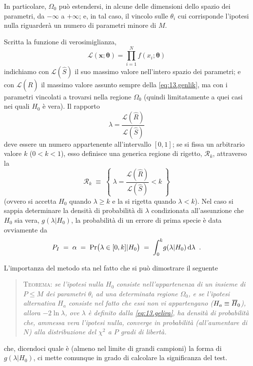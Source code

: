 In particolare, $\Omega_0$ pu\`o estendersi, in alcune delle
dimensioni dello spazio dei parametri, da $-\infty$ a
$+\infty$; e, in tal caso, il vincolo sulle $\theta_i$ cui
corrisponde l'ipotesi nulla riguarder\`a un numero di
parametri minore di $M$.

Scritta la funzione di verosimiglianza,
\begin{equation} \label{eq:13.genlik}
  \mathcal{L} ( \boldsymbol{x}; \boldsymbol{\theta} ) =
    \prod_{i=1}^N f(x_i; \boldsymbol{\theta} )
\end{equation}
indichiamo con $\mathcal{L} (\widehat S)$ il suo massimo
valore nell'intero spazio dei parametri; e con $\mathcal{L}
(\widehat R)$ il massimo valore assunto sempre della
\eqref{eq:13.genlik}, ma con i parametri vincolati a
trovarsi nella regione $\Omega_0$ (quindi limitatamente a
quei casi nei quali $H_0$ \`e vera).  Il rapporto
\begin{equation} \label{eq:13.gelira}
  \lambda = \frac{\mathcal{L} (\widehat R)}{\mathcal{L} (\widehat
    S)}
\end{equation}
deve essere un numero appartenente all'intervallo $[0,1]$;
se si fissa un arbitrario valore $k$ ($0<k<1$), esso
definisce una generica regione di rigetto, $\mathcal{R}_k$,
attraverso la
\begin{equation*}
  \mathcal{R}_k \; \equiv \; \left\{ \; \lambda =
    \frac{\mathcal{L} (\widehat R)}{\mathcal{L} (\widehat
      S)} < k \; \right\}
\end{equation*}
(ovvero si accetta $H_0$ quando $\lambda \ge k$ e la si
rigetta quando $\lambda < k$).  Nel caso si sappia
determinare la densit\`a di probabilit\`a di $\lambda$
condizionata all'assunzione che $H_0$ sia vera, $g(\lambda |
H_0)$, la probabilit\`a di un errore di prima specie \`e
data ovviamente da
\begin{equation*}
  P_I \; = \; \alpha \; = \; \Pr \bigl( \lambda \in [0,k] |
    H_0 \bigr) \; = \; \int_0^k \! g(\lambda | H_0) \, \mathrm{d}
    \lambda \;\; .
\end{equation*}

L'importanza del metodo sta nel fatto che si pu\`o
dimostrare il seguente
\begin{quote}
  \textsc{Teorema:} \textit{se l'ipotesi nulla $H_0$
    consiste nell'appartenenza di un insieme di $P \le M$
    dei parametri $\theta_i$ ad una determinata regione
    $\Omega_0$, e se l'ipotesi alternativa $H_a$ consiste
    nel fatto che essi non vi appartengano ($H_a \equiv
    \ob{H}_0$), allora $- 2 \ln \lambda$, ove $\lambda$ \`e
    definito dalla \eqref{eq:13.gelira}, ha densit\`a di
    probabilit\`a che, ammessa vera l'ipotesi nulla,
    converge in probabilit\`a (all'aumentare di $N$) alla
    distribuzione del $\chi^2$ a $P$ gradi di libert\`a.}
\end{quote}%
che, dicendoci quale \`e (almeno nel limite di grandi
campioni) la forma di $g(\lambda | H_0)$, ci mette comunque
in grado di calcolare la significanza del test.

